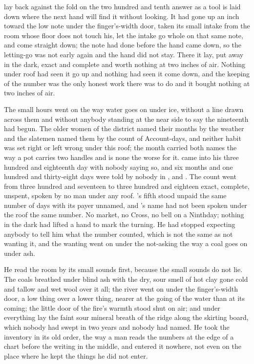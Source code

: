 
 lay back against the fold on the two hundred and tenth answer as a tool is laid down where the next hand will find it without looking. It had gone up an inch toward the low note under the finger's-width door, taken its small intake from the room whose floor does not touch his, let the intake go whole on that same note, and come straight down; the note had done before the hand came down, so the letting-go was not early again and the hand did not stay. There it lay, put away in the dark, exact and complete and worth nothing at two inches of air. Nothing under  roof had seen it go up and nothing had seen it come down, and the keeping of the number was the only honest work there was to do and it bought nothing at two inches of air.

The small hours went on the way water goes on under ice, without a line drawn across them and without anybody standing at the near side to say the nineteenth had begun. The older women of the district named their months by the weather and the slatemen named them by the count of Account-days, and neither habit was set right or left wrong under this roof; the month carried both names the way a pot carries two handles and is none the worse for it.  came into his three hundred and eighteenth day with nobody saying so, and six months and one hundred and thirty-eight days were told by nobody in ,  and . The count went from three hundred and seventeen to three hundred and eighteen exact, complete, unspent, spoken by no man under any roof. 's fifth stood unpaid the same number of days with its payer unnamed, and 's name had not been spoken under the roof the same number. No market, no Cross, no bell on a Ninthday; nothing in the dark had lifted a hand to mark the turning. He had stopped expecting anybody to tell him what the number counted, which is not the same as not wanting it, and the wanting went on under the not-asking the way a coal goes on under ash.

He read the room by its small sounds first, because the small sounds do not lie. The coals breathed under blind ash with the dry, sour smell of hot clay gone cold and tallow and wet wool over it all; the river went on  under the finger's-width door, a low thing over a lower thing, nearer at the going of the water than at its coming; the little door of the fire's warmth stood shut on air; and under everything lay the faint sour mineral breath of the  ridge along the skirting board, which nobody had swept in two years and nobody had named. He took the inventory in its old order, the way a man reads the numbers at the edge of a chart before the writing in the middle, and entered it nowhere, not even on the place where he kept the things he did not enter.


